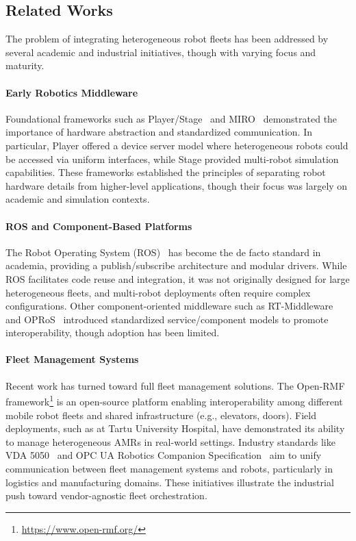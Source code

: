 \documentclass[conference]{IEEEtran}
\begin{document}
\subsection{Related Works}
The problem of integrating heterogeneous robot fleets has been addressed 
 by several academic and industrial initiatives, though with varying focus and maturity.

\paragraph{Early Robotics Middleware} 
Foundational frameworks such as Player/Stage~\cite{vaughan2003player} 
 and MIRO~\cite{DBLP:journals/trob/UtzSEK02} demonstrated the importance 
 of hardware abstraction and standardized communication. 
% 
In particular, Player offered a device server model where heterogeneous robots could be accessed via uniform interfaces, 
 while Stage provided multi-robot simulation capabilities. 
% 
These frameworks established the principles of separating robot hardware details from higher-level applications, 
 though their focus was largely on academic and simulation contexts.

\paragraph{ROS and Component-Based Platforms} 
The Robot Operating System (ROS)~\cite{quigley2009ros} has become the de facto standard in academia, 
 providing a publish/subscribe architecture and modular drivers. 
% 
While ROS facilitates code reuse and integration, it was not originally designed for large heterogeneous fleets, 
 and multi-robot deployments often require complex configurations. 
% 
Other component-oriented middleware such as RT-Middleware~\cite{DBLP:conf/iros/AndoSKKY05} 
 and OPRoS~\cite{jang2010opros} introduced standardized service/component models 
 to promote interoperability, though adoption has been limited.

\paragraph{Fleet Management Systems} 
Recent work has turned toward full fleet management solutions. 
%
The Open-RMF framework\footnote{\url{https://www.open-rmf.org/}} is an open-source platform 
 enabling interoperability among different mobile robot fleets and shared infrastructure (e.g., elevators, doors). 
% 
Field deployments, such as at Tartu University Hospital, have demonstrated its ability 
 to manage heterogeneous AMRs in real-world settings. 
% 
Industry standards like VDA 5050~\cite{franke2023identification} 
 and OPC UA Robotics Companion Specification~\cite{DBLP:conf/etfa/ProfanterB0K19} 
 aim to unify communication between fleet management systems and robots, 
 particularly in logistics and manufacturing domains. 
%  
These initiatives illustrate the industrial push toward vendor-agnostic fleet orchestration.
\end{document}
